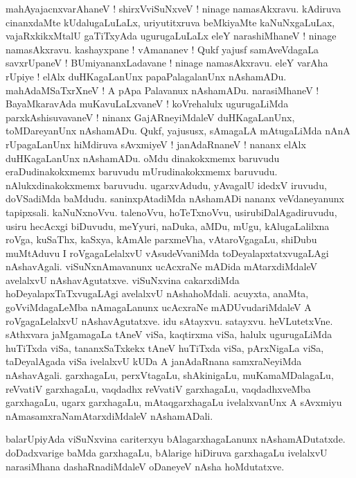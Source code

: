 \documentclass{article}
\begin{document}
\begin{mn}%
mahAyajacnxvarAhaneV ! shirxVviSuNxveV ! ninage namasAkxravu. kAdiruva cinanxdaMte kUdalugaLuLaLx, 
uriyutitxruva beMkiyaMte kaNuNxgaLuLax, vajaRxkikxMtalU gaTiTxyAda ugurugaLuLaLx eleY narashiMhaneV 
! ninage namasAkxravu. kashayxpane ! vAmananev ! Qukf yajusf samAveVdagaLa savxrUpaneV ! 
BUmiyananxLadavane ! ninage namasAkxravu. eleY varAha rUpiye ! elAlx duHKagaLanUnx 
papaPalagalanUnx nAshamADu.  mahAdaMSaTxrXneV ! A pApa Palavanux nAshamADu. narasiMhaneV ! 
BayaMkaravAda muKavuLaLxvaneV ! koVrehalulx ugurugaLiMda parxkAshisuvavaneV ! ninanx 
GajARneyiMdaleV duHKagaLanUnx, toMDareyanUnx nAshamADu. Qukf, yajususx, sAmagaLA mAtugaLiMda nAnA 
rUpagaLanUnx hiMdiruva sAvxmiyeV ! janAdaRnaneV ! nananx elAlx duHKagaLanUnx nAshamADu. oMdu 
dinakokxmemx baruvudu eraDudinakokxmemx baruvudu mUrudinakokxmemx baruvudu. nAlukxdinakokxmemx 
baruvudu. ugarxvAdudu, yAvagalU idedxV iruvudu, doVSadiMda baMdudu. saninxpAtadiMda nAshamADi 
nananx veVdaneyanunx tapipxsali. kaNuNxnoVvu. talenoVvu, hoTeTxnoVvu, usirubiDalAgadiruvudu, usiru 
hecAcxgi biDuvudu, meYyuri, naDuka, aMDu, mUgu, kAlugaLalilxna roVga, kuSaThx, kaSxya, kAmAle 
parxmeVha, vAtaroVgagaLu, shiDubu muMtAduvu I roVgagaLelalxvU vAsudeVvaniMda 
toDeyalapxtatxvugaLAgi nAshavAgali. viSuNxnAmavanunx ucAcxraNe mADida mAtarxdiMdaleV avelalxvU 
nAshavAgutatxve. viSuNxvina cakarxdiMda hoDeyalapxTaTxvugaLAgi avelalxvU nAshahoMdali. acuyxta, 
anaMta, goVviMdagaLeMba nAmagaLanunx ucAcxraNe mADUvudariMdaleV A roVgagaLelalxvU nAshavAgutatxve. 
idu sAtayxvu. satayxvu. heVLutetxVne. sAthxvara jaMgamagaLa tAneV viSa, kaqtirxma viSa, halulx 
ugurugaLiMda huTiTxda viSa, tananxSaTxkekx tAneV huTiTxda viSa, pArxNigaLa viSa, taDeyalAgada viSa 
ivelalxvU kUDa A janAdaRnana samxraNeyiMda nAshavAgali. garxhagaLu, perxVtagaLu, shAkinigaLu, 
muKamaMDalagaLu, reVvatiV garxhagaLu, vaqdadhx reVvatiV garxhagaLu, vaqdadhxveMba garxhagaLu, 
ugarx garxhagaLu, mAtaqgarxhagaLu ivelalxvanUnx A sAvxmiyu nAmasamxraNamAtarxdiMdaleV nAshamADali.
\end{mn}

\begin{mn}%
balarUpiyAda viSuNxvina cariterxyu bAlagarxhagaLanunx nAshamADutatxde. doDadxvarige baMda 
garxhagaLu, bAlarige hiDiruva garxhagaLu ivelalxvU narasiMhana dashaRnadiMdaleV oDaneyeV nAsha 
hoMdutatxve.
\end{mn}
\end{document}

